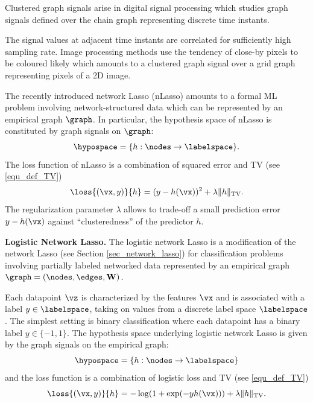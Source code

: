 \documentclass[12pt]{report}
\begin{document}
Clustered graph signals arise in digital signal processing which 
studies graph signals defined over the chain graph representing 
discrete time instants. 

The signal values at adjacent time instants are correlated 
for sufficiently high sampling rate. Image processing methods 
use the tendency of close-by pixels to be coloured likely 
which amounts to a clustered graph signal over a grid 
graph representing pixels of a 2D image.  

The recently introduced network Lasso (nLasso) amounts to a formal ML problem involving 
network-structured data which can be represented by an empirical graph $\graph$. In particular, 
the hypothesis space of nLasso is constituted by graph signals on $\graph$: 
\begin{equation}
\hypospace  = \{ h: \nodes \rightarrow \labelspace \}.
\end{equation} 
The loss function of nLasso is a combination of squared error and TV (see \eqref{equ_def_TV}) 
\begin{equation}
\loss{(\vx,y)}{h} = (y - h(\vx))^{2} + \lambda \| h  \|_{\rm TV}. 
\end{equation} 
The regularization parameter $\lambda$ allows to trade-off a small prediction error $y-h(\vx)$ 
against ``clusteredness'' of the predictor $h$. 


{\bf Logistic Network Lasso.} The logistic network Lasso \cite{LogisticNLassoAsilomar2018,LogisticNLasso} 
is a modification of the network Lasso (see Section \ref{sec_network_lasso}) for classification problems 
involving partially labeled networked data represented by an empirical graph $\graph=(\nodes,\edges,\mathbf{W})$. 

Each datapoint $\vz$ is characterized by the features $\vx$ and is associated with a label $y \in \labelspace$, 
taking on values from a discrete label space $\labelspace$. The simplest setting is binary classification where 
each datapoint has a binary label $y \in \{-1,1\}$. The hypothesis space underlying logistic network Lasso 
is given by the graph signals on the empirical graph: 
\begin{equation}
\hypospace  = \{ h: \nodes \rightarrow \labelspace \}
\end{equation} 
and the loss function is a combination of logistic loss and TV (see \eqref{equ_def_TV})
\begin{equation}
\loss{(\vx,y)}{h} = -\log(1+ \exp(-yh(\vx))) + \lambda \| h  \|_{\rm TV}. 
\end{equation} 
\end{document}
